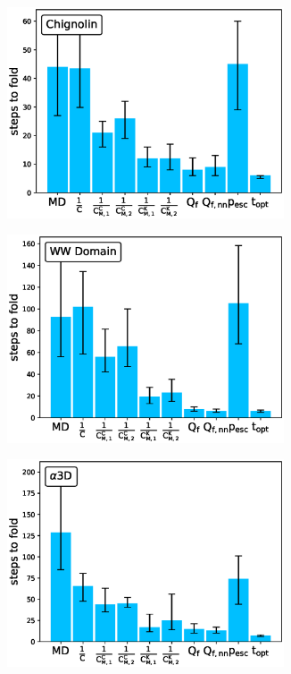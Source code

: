 \begin{figure}[H]
  \begin{subfigure}[t]{0.5\textwidth}
    \includegraphics[width=0.9\textwidth]{figures/CLN025_7_steps10000_nparallel100_fold.eps}
  \end{subfigure}
  \begin{subfigure}[t]{0.5\textwidth}
    \includegraphics[width=0.9\textwidth]{figures/GTT_7_steps10000_nparallel100_fold.eps}
  \end{subfigure}
  \begin{subfigure}[t]{0.5\textwidth}
    \includegraphics[width=0.9\textwidth]{figures/A3D_7_steps10000_nparallel100_fold.eps}

\end{subfigure}
\end{figure}
